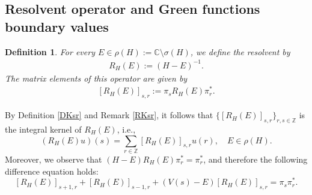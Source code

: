 \documentclass[12pt,oneside,onecolumn,open]{article}
\newtheorem{defi}[teo]{Definition}
\newtheorem{lema}[teo]{Lemma}
\begin{document}




    


\subsection{Resolvent operator and Green functions boundary values}\label{secres}
\begin{defi}\label{PRdefi}
For every $E \in \rho(H) := \mathbb{C} \setminus \sigma(H)$, we define the  resolvent by
\begin{align}\label{perturbedresolvent}
R_{H}(E) := (H - E)^{-1}.
\end{align}
The matrix elements of this operator are given by
\begin{align}\label{me}
[R_{H}(E)]_{s, r} := \pi_s R_{H}(E)\pi_r^{*}.
\end{align}
\end{defi}

By Definition \ref{DKsr} and Remark \ref{RKsr}, it follows that $\{[R_{H}(E)]_{s, r}\}_{r, s \in \mathbb{Z}}$ is the integral kernel of $R_{H}(E)$, i.e.,
\begin{equation}\label{integraloperator}
(R_{H}(E) u)(s) = \sum_{r \in \mathbb{Z}} [R_{H}(E)]_{s,r} u(r), \quad E \in \rho(H).
\end{equation}
Moreover, we observe that $(H - E) R_{H}(E) \pi_r^{*} = \pi_r^{*}$, and therefore the following difference equation holds:
\begin{equation}
\label{eq:kernel}
[R_{H}(E)]_{s+1,r} + [R_{H}(E)]_{s-1,r} + (V(s) - E) [R_{H}(E)]_{s,r} = \pi_s \pi_r^{*}.
\end{equation}
\end{document}
